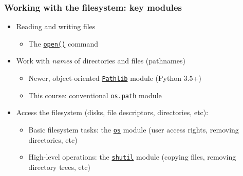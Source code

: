 \documentclass[xcolor=table]{beamer}
\begin{document}
\begin{frame}[fragile]
    \frametitle{Working with the filesystem: key modules}
\begin{itemize}\addtolength{\itemsep}{\baselineskip}
\item Reading and writing files
    \begin{itemize}
        \item The \href{https://docs.python.org/3/library/functions.html#open}{\texttt{open()}} command \pause
    \end{itemize}
    \item Work with \emph{names} of directories and files (pathnames) \pause
    \begin{itemize}
        \item Newer, object-oriented \href{https://docs.python.org/3/library/pathlib.html#module-pathlib}{\texttt{Pathlib}} module (Python 3.5+) \pause
        \item This course: conventional \href{https://docs.python.org/3.7/library/os.path.html}{\texttt{os.path}} module \pause
    \end{itemize}
\item Access the filesystem (disks, file descriptors, directories, etc): \pause
    \begin{itemize}
        \item Basic filesystem tasks: the \href{https://docs.python.org/3.7/library/os.html#module-os}{\texttt{os}} module (user access rights, removing directories, etc) \pause
        \item High-level operations: the \href{https://docs.python.org/3/library/shutil.html}{\texttt{shutil}} module (copying files, removing directory trees, etc)  \pause
    \end{itemize}
\end{itemize}
\end{frame}

\end{document}
